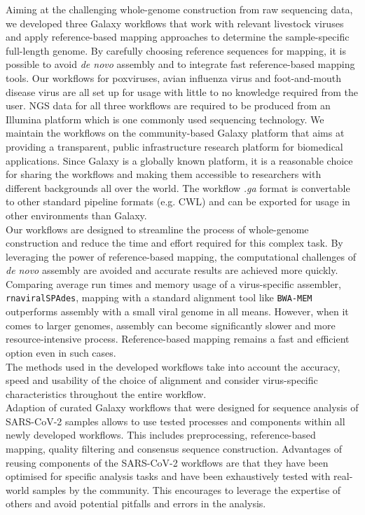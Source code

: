 Aiming at the challenging whole-genome construction from raw sequencing data, we developed three Galaxy workflows that work with relevant livestock viruses and apply reference-based mapping approaches to determine the sample-specific full-length genome. By carefully choosing reference sequences for mapping, it is possible to avoid \textit{de novo} assembly and to integrate fast reference-based mapping tools. Our workflows for poxviruses, avian influenza virus and foot-and-mouth disease virus are all set up for usage with little to no knowledge required from the user. \ac{NGS} data for all three workflows are required to be produced from an Illumina platform which is one commonly used sequencing technology. We maintain the workflows on the community-based Galaxy platform that aims at providing a transparent, public infrastructure research platform for biomedical applications. Since Galaxy is a globally known platform, it is a reasonable choice for sharing the workflows and making them accessible to researchers with different backgrounds all over the world. The workflow \textit{.ga} format is convertable to other standard pipeline formats (e.g. \ac{CWL}) and can be exported for usage in other environments than Galaxy. \\
Our workflows are designed to streamline the process of whole-genome construction and reduce the time and effort required for this complex task. By leveraging the power of reference-based mapping, the computational challenges of \textit{de novo} assembly are avoided and accurate results are achieved more quickly. Comparing average run times and memory usage of a virus-specific assembler, \texttt{rnaviralSPAdes}, mapping with a standard alignment tool like \texttt{BWA-MEM} outperforms assembly with a small viral genome in all means. However, when it comes to larger genomes, assembly can become significantly slower and more resource-intensive process. Reference-based mapping remains a fast and efficient option even in such cases.\\
The methods used in the developed workflows take into account the accuracy, speed and usability of the choice of alignment and consider virus-specific characteristics throughout the entire workflow.\\
Adaption of curated Galaxy workflows that were designed for sequence analysis of \ac{SARS-CoV-2} samples allows to use tested processes and components within all newly developed workflows. This includes preprocessing, reference-based mapping, quality filtering and consensus sequence construction. Advantages of reusing components of the \ac{SARS-CoV-2} workflows are that they have been optimised for specific analysis tasks and have been exhaustively tested with real-world samples by the community. This encourages to leverage the expertise of others and avoid potential pitfalls and errors in the analysis.

